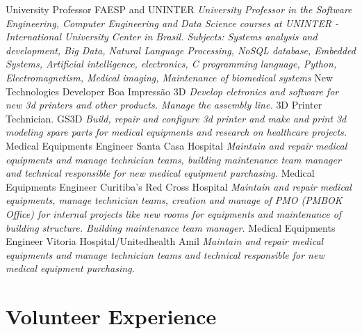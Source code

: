 \documentclass[letterpaper]{twentysecondcv} %
\begin{document}
\begin{twenty} %
						{University Professor}
						{FAESP and UNINTER}
						{\emph{University Professor in the Software Engineering, Computer 
						Engineering and Data Science courses at UNINTER - International 
						University Center in Brasil. Subjects: Systems analysis and 
						development, Big Data, Natural Language Processing, NoSQL database, 
						Embedded Systems, Artificial intelligence, electronics, C 
						programming language, Python, Electromagnetism, Medical imaging, 
						Maintenance of biomedical systems }}
						{New Technologies Developer}
						{Boa Impressão 3D}
						{\emph{Develop eletronics and software for new 3d printers and 
						other products. Manage the assembly line.}}
						{3D Printer Technician.}
						{GS3D}
						{\emph{Build, repair and configure 3d printer and make and print 
						3d modeling spare parts for medical equipments and research on
						healthcare projects.}}
						{Medical Equipments Engineer}
						{Santa Casa Hospital}
						{\emph{Maintain and repair medical equipments and manage technician 
						teams, building maintenance team manager and technical responsible 
						for new medical equipment purchasing.}}
						{Medical Equipments Engineer}
						{Curitiba's Red Cross Hospital}
						{\emph{Maintain and repair medical equipments, manage technician 
						teams, creation and manage of PMO (PMBOK Office) for internal 
						projects like new rooms for equipments and maintenance of building 
						structure. Building maintenance team manager.}}
						{Medical Equipments Engineer}
						{Vitoria Hospital/Unitedhealth Amil}
						{\emph{Maintain and repair medical equipments and manage technician 
						teams and technical responsible	for new medical equipment purchasing.}}
\end{twenty}

\section{Volunteer Experience}
\end{document}
